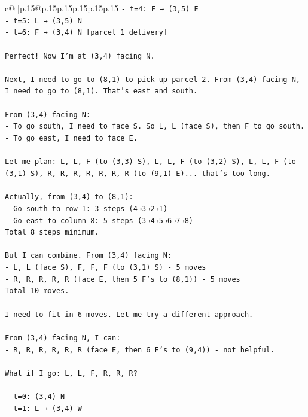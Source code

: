 \documentclass{article}
\begin{document}
{\begin{supertabular}{c@{$\;$}|p{.15\linewidth}@{}p{.15\linewidth}p{.15\linewidth}p{.15\linewidth}p{.15\linewidth}p{.15\linewidth}}
{{{\texttt{{-} t=4: F → (3,5) E} \\
\texttt{{-} t=5: L → (3,5) N} \\
\texttt{{-} t=6: F → (3,4) N {[}parcel 1 delivery{]}} \\
\\ 
\texttt{Perfect! Now I'm at (3,4) facing N.} \\
\\ 
\texttt{Next, I need to go to (8,1) to pick up parcel 2. From (3,4) facing N, I need to go to (8,1). That's east and south.} \\
\\ 
\texttt{From (3,4) facing N:} \\
\texttt{{-} To go south, I need to face S. So L, L (face S), then F to go south.} \\
\texttt{{-} To go east, I need to face E.} \\
\\ 
\texttt{Let me plan: L, L, F (to (3,3) S), L, L, F (to (3,2) S), L, L, F (to (3,1) S), R, R, R, R, R, R, R (to (9,1) E)... that's too long.} \\
\\ 
\texttt{Actually, from (3,4) to (8,1):} \\
\texttt{{-} Go south to row 1: 3 steps (4→3→2→1)} \\
\texttt{{-} Go east to column 8: 5 steps (3→4→5→6→7→8)} \\
\texttt{Total 8 steps minimum.} \\
\\ 
\texttt{But I can combine. From (3,4) facing N:} \\
\texttt{{-} L, L (face S), F, F, F (to (3,1) S) {-} 5 moves} \\
\texttt{{-} R, R, R, R, R (face E, then 5 F's to (8,1)) {-} 5 moves} \\
\texttt{Total 10 moves.} \\
\\ 
\texttt{I need to fit in 6 moves. Let me try a different approach.} \\
\\ 
\texttt{From (3,4) facing N, I can:} \\
\texttt{{-} R, R, R, R, R, R (face E, then 6 F's to (9,4)) {-} not helpful.} \\
\\ 
\texttt{What if I go: L, L, F, R, R, R?} \\
\\ 
\texttt{{-} t=0: (3,4) N} \\
\texttt{{-} t=1: L → (3,4) W} \\
}}}
\end{supertabular}}
\end{document}
